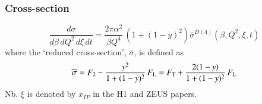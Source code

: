 \makeatletter
\def\comsp{\@ifnextchar,\relax{\@ifnextchar\ \relax{\@ifnextchar:\relax{\@ifnextchar.\relax\ }}}}
\makeatother
\DeclareRobustCommand{\ie}{{\it i.e.}\comsp}
\DeclareRobustCommand{\eg}{{\it e.g.}\comsp}
\DeclareRobustCommand{\cf}{{\it cf.}\comsp}
\DeclareRobustCommand{\etal}{{\it et al.}\comsp}
\DeclareRobustCommand\bs{\ensuremath{\backslash}}
\newcommand\ssp{\ifmmode\relax\else\comsp\fi}

\newcommand\Eq[1]{(\ref{#1})}
\newcommand\Fig[1]{Fig.~\ref{#1}}
\DeclareRobustCommand\NF{\ensuremath{N_{\rm f}}\ssp}
\DeclareRobustCommand\GeV{\ensuremath{{\rm GeV}}\ssp}
\DeclareRobustCommand\FL{\ensuremath{F_{\mathrm{L}}}\ssp}
\DeclareRobustCommand\FT{\ensuremath{F_{\mathrm{T}}}\ssp}
\newcommand\AP {{\cal P}}

\def \beq{\begin{equation}}
\def \eeq{\end{equation}}
\def \beqa{\begin{eqnarray}}
\def \eeqa{\end{eqnarray}}
\def \beqal{\begin{subequations}\begin{eqnarray}}
\def \eeqal{\end{eqnarray}\end{subequations}}

\let\optspace=\ssp
\DeclareRobustCommand{\as}[1]{\ensuremath{\alpha_{\rm s}(#1^2)}\optspace}
\newcommand{\asotp}{\ensuremath{\frac{\alpha_{\rm s}}{2\pi}}\optspace}
\newcommand{\Sgl}[1]{\ensuremath{\tilde f_{#1+}}\optspace}
\newcommand{\Pom}{{I\!P}}
\newcommand{\Reg}{{I\!R}}
\newcommand{\xP}{\xi}
\newcommand\sigRed{\ensuremath{\overline\sigma}}
\newcommand\DX{\ensuremath{\mathcal{X}}}



\subsubsection {Cross-section}

\beq
  \frac{d\sigma}{d\beta\,dQ^2\,d\xP\,dt}
=
  \frac{2\pi\alpha^2}{\beta Q^4}\,
    \left( 1 +  (1-y)^2 \right) \sigRed^{D(4)}(\beta,Q^2,\xP,t)
\label{Dxs}
\eeq
where the `reduced cross-section', \sigRed, is defined as
\beq
\label{eq:sigred}
\sigRed
 = F_2 - \frac{y^2}{1 +  (1-y)^2}\, \FL
 = \FT + \frac{2(1-y)}{1 +  (1-y)^2}\, \FL
\eeq
Nb. $\xi$ is denoted by $x_\Pom$ in the H1 and ZEUS papers.

